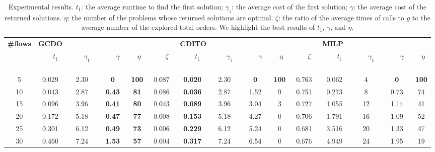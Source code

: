 \documentclass[letterpaper]{article} %
\theoremstyle{definition}
\begin{document}
\begin{table*}[ht]\small
\centering
\begin{tabular}{|c||c|c|c|c|c||c|c|c|c|c||c|c|c|c|}
\hline
\multirow{2}{*}{\textbf{\#flows}} & \multicolumn{5}{l|}{\hspace{0.23\columnwidth}\textbf{GCDO}} & \multicolumn{5}{l|}{\hspace{0.23\columnwidth}\textbf{CDITO}} & \multicolumn{4}{l|}{\hspace{0.23\columnwidth}\textbf{MILP}} \\ 
\cline{2-15} 
& \ \ \ $t_1$ \ \ \  & \ \ \ $\gamma_1$ \ \ \ & \ \ \  $\gamma$ \ \ \  & \ $\eta$ \ & \ \ \  $\zeta$ \ \ \  & \ \ \  $t_1$ \ \ \  & \ \ \  $\gamma_1$ \ \ \   & \  \ \  $\gamma$ \ \ \   & \ $\eta$  \ & \ \ \  $\zeta$ \ \ \ & \ \ \  $t_1$ \ \ \  & \ \ \  $\gamma_1$ \ \ \   & \  \ \  $\gamma$ \ \ \   & \  $\eta$  \    \\ \hline
5 & 0.029 & 2.30 & \textbf{0} & \textbf{100} & 0.087 & \textbf{0.020} & 2.30 & \textbf{0} & \textbf{100} & 0.763 & 0.062 & 4 & \textbf{0} & \textbf{100} \\ \hline
10 & 0.043 & 2.87 & \textbf{0.43} & \textbf{81} & 0.086 & \textbf{0.036} & 2.87 & 1.52 & 9 & 0.751 & 0.273 & 8 & 0.73 & 74 \\ \hline
15 & 0.096 & 3.96 & \textbf{0.41} & \textbf{80} & 0.043 & \textbf{0.089} & 3.96 & 3.04 & 3 & 0.727 & 1.055 & 12 & 1.14 & 41 \\ \hline
20 & 0.172 & 5.18 & \textbf{0.47} & \textbf{77} & 0.008 & \textbf{0.153} & 5.18 & 4.27 & 0 & 0.706 & 1.791 & 16 & 1.09 & 52  \\ \hline
25 & 0.301 & 6.12 & \textbf{0.49} & \textbf{73} & 0.006 & \textbf{0.229} & 6.12 & 5.24 & 0 & 0.681 & 3.516 & 20 & 1.33 & 47 \\  \hline
30 & 0.460 & 7.24 & \textbf{1.53} & \textbf{57} & 0.004  & \textbf{0.317} & 7.24 & 6.54 & 0 & 0.676 & 4.949 & 24 & 1.95 & 19 \\ \hline
\end{tabular}
\caption{Experimental results. $t_1$: the average runtime to find the first solution; $\gamma_1$: the average cost of the first solution; $\gamma$: the average cost of the returned solutions. $\eta$: the number of the problems whose returned solutions are optimal. $\zeta$: the ratio of the average times of calls to $g$  to the average number of the explored total orders. We highlight the best results of $t_1$, $\gamma$, and $\eta$.}
\label{table:result}
\vspace{-10pt}
\end{table*}
\end{document}
